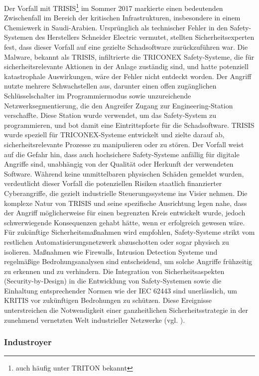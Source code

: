Der Vorfall mit TRISIS\footnote{auch häufig unter TRITON bekannt} im Sommer 2017 markierte einen bedeutenden Zwischenfall im Bereich der kritischen Infrastrukturen, insbesondere in einem Chemiewerk in Saudi-Arabien. Ursprünglich als technischer Fehler in den Safety-Systemen des Herstellers Schneider Electric vermutet, stellten Sicherheitsexperten fest, dass dieser Vorfall auf eine gezielte Schadsoftware zurückzuführen war. Die Malware, bekannt als TRISIS, infiltrierte die TRICONEX Safety-Systeme, die für sicherheitsrelevante Aktionen in der Anlage zuständig sind, und hatte potenziell katastrophale Auswirkungen, wäre der Fehler nicht entdeckt worden. Der Angriff nutzte mehrere Schwachstellen aus, darunter einen offen zugänglichen Schlüsselschalter im Programmiermodus sowie unzureichende Netzwerksegmentierung, die den Angreifer Zugang zur Engineering-Station verschaffte. Diese Station wurde verwendet, um das Safety-System zu programmieren, und bot damit eine Eintrittspforte für die Schadsoftware. TRISIS wurde speziell für TRICONEX-Systeme entwickelt und zielte darauf ab, sicherheitsrelevante Prozesse zu manipulieren oder zu stören. Der Vorfall weist auf die Gefahr hin, dass auch hochsichere Safety-Systeme anfällig für digitale Angriffe sind, unabhängig von der Qualität oder Herkunft der verwendeten Software. Während keine unmittelbaren physischen Schäden gemeldet wurden, verdeutlicht dieser Vorfall die potenziellen Risiken staatlich finanzierter Cyberangriffe, die gezielt industrielle Steuerungssysteme ins Visier nehmen. Die komplexe Natur von TRISIS und seine spezifische Ausrichtung legen nahe, dass der Angriff möglicherweise für einen begrenzten Kreis entwickelt wurde, jedoch schwerwiegende Konsequenzen gehabt hätte, wenn er erfolgreich gewesen wäre. Für zukünftige Sicherheitsmaßnahmen wird empfohlen, Safety-Systeme strikt vom restlichen Automatisierungsnetzwerk abzuschotten oder sogar physisch zu isolieren. Maßnahmen wie Firewalls, Intrusion Detection Systeme und regelmäßige Bedrohungsanalysen sind entscheidend, um solche Angriffe frühzeitig zu erkennen und zu verhindern. Die Integration von Sicherheitsaspekten (Security-by-Design) in die Entwicklung von Safety-Systemen sowie die Einhaltung entsprechender Normen wie der IEC 62443 sind unerlässlich, um KRITIS vor zukünftigen Bedrohungen zu schützen. Diese Ereignisse unterstreichen die Notwendigkeit einer ganzheitlichen Sicherheitsstrategie in der zunehmend vernetzten Welt industrieller Netzwerke (vgl. \cite{TRISIS}).

\subsubsection{Industroyer}

